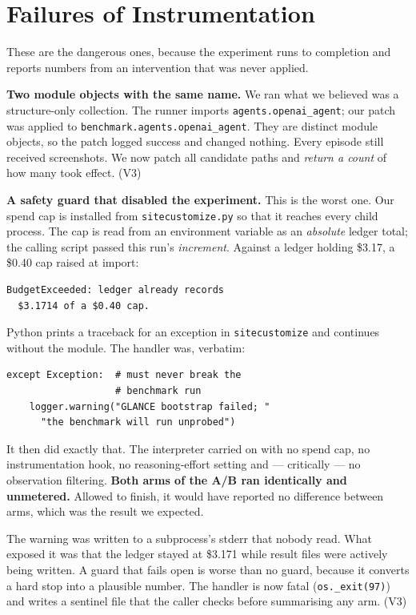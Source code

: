 \documentclass[conference]{IEEEtran}
\begin{document}
\section{Failures of Instrumentation}

These are the dangerous ones, because the experiment runs to completion and
reports numbers from an intervention that was never applied.

\textbf{Two module objects with the same name.} We ran what we believed was a
structure-only collection. The runner imports \texttt{agents.openai\_agent};
our patch was applied to \texttt{benchmark.agents.openai\_agent}. They are
distinct module objects, so the patch logged success and changed nothing. Every
episode still received screenshots. We now patch all candidate paths and
\emph{return a count} of how many took effect. (V3)

\textbf{A safety guard that disabled the experiment.}
\label{sec:guard}
This is the worst one. Our spend cap is installed from
\texttt{sitecustomize.py} so that it reaches every child process. The cap is
read from an environment variable as an \emph{absolute} ledger total; the
calling script passed this run's \emph{increment}. Against a ledger holding
\$3.17, a \$0.40 cap raised at import:

\begin{verbatim}
BudgetExceeded: ledger already records
  $3.1714 of a $0.40 cap.
\end{verbatim}

Python prints a traceback for an exception in \texttt{sitecustomize} and
continues without the module. The handler was, verbatim:

\begin{verbatim}
except Exception:  # must never break the
                   # benchmark run
    logger.warning("GLANCE bootstrap failed; "
      "the benchmark will run unprobed")
\end{verbatim}

It then did exactly that. The interpreter carried on with no spend cap, no
instrumentation hook, no reasoning-effort setting and --- critically --- no
observation filtering. \textbf{Both arms of the A/B ran identically and
unmetered.} Allowed to finish, it would have reported no difference between
arms, which was the result we expected.

The warning was written to a subprocess's stderr that nobody read. What exposed
it was that the ledger stayed at \$3.171 while result files were actively being
written. A guard that fails open is worse than no guard, because it converts a
hard stop into a plausible number. The handler is now fatal
(\texttt{os.\_exit(97)}) and writes a sentinel file that the caller checks
before summarising any arm. (V3)
\end{document}
